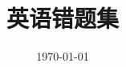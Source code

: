 \documentclass[a4paper]{ctexart}
\title{\heiti\zihao{2} 英语错题集}
\date{\today}
\begin{document}
    \maketitle
    \thispagestyle{empty}

    \newpage

    \setcounter{page}{1}
    \cfoot{\thepage}

    \renewcommand{\footrulewidth}{1pt}
    \tableofcontents

    \newpage


    \setcounter{page}{1}


    \begin{sloppy}
        \begin{enumerate}
            
        \end{enumerate}
    \end{sloppy}
\end{document}
